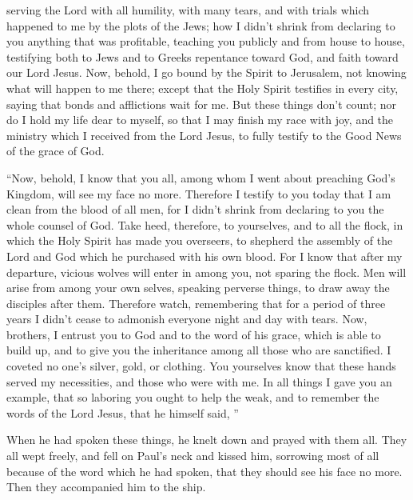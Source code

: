 {serving the Lord with all humility, with many tears, and with trials which happened to me by the plots of the Jews;
how I didn’t shrink from declaring to you anything that was profitable, teaching you publicly and from house to house,
testifying both to Jews and to Greeks repentance toward God, and faith toward our Lord Jesus.
Now, behold, I go bound by the Spirit to Jerusalem, not knowing what will happen to me there;
except that the Holy Spirit testifies in every city, saying that bonds and afflictions wait for me.
But these things don’t count; nor do I hold my life dear to myself, so that I may finish my race with joy, and the ministry which I received from the Lord Jesus, to fully testify to the Good News of the grace of God.
\par }{\PP {}“Now, behold, I know that you all, among whom I went about preaching God’s Kingdom, will see my face no more.
Therefore I testify to you today that I am clean from the blood of all men,
for I didn’t shrink from declaring to you the whole counsel of God.
Take heed, therefore, to yourselves, and to all the flock, in which the Holy Spirit has made you overseers, to shepherd the assembly of the Lord and
 God which he purchased with his own blood.
For I know that after my departure, vicious wolves will enter in among you, not sparing the flock.
Men will arise from among your own selves, speaking perverse things, to draw away the disciples after them.
Therefore watch, remembering that for a period of three years I didn’t cease to admonish everyone night and day with tears.
Now, brothers, I entrust you to God and to the word of his grace, which is able to build up, and to give you the inheritance among all those who are sanctified.
I coveted no one’s silver, gold, or clothing.
You yourselves know that these hands served my necessities, and those who were with me.
In all things I gave you an example, that so laboring you ought to help the weak, and to remember the words of the Lord Jesus, that he himself said,
{}”
\par }{\PP {}When he had spoken these things, he knelt down and prayed with them all.
They all wept freely, and fell on Paul’s neck and kissed him,
sorrowing most of all because of the word which he had spoken, that they should see his face no more. Then they accompanied him to the ship.

}
